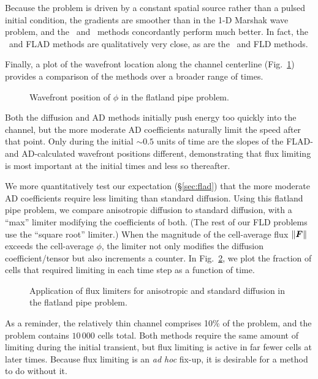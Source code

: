 Because the problem is driven by a constant spatial source rather than a pulsed
initial condition, the gradients are smoother than in the 1-D Marshak wave
problem, and the \Pone\ and \APone\ methods concordantly perform much better.
In fact, the
\APone\ and FLAD methods are qualitatively very close, as are the \Pone\ and FLD
methods.

Finally, a plot of the wavefront location along the channel centerline
(Fig.~\ref{fig:crashaltWavefront}) provides a comparison of the methods over a
broader range of times.
%
\begin{figure}[htb]
  \centering\small
  
  \caption{Wavefront position of $\phi$ in the flatland pipe problem.}
  \label{fig:crashaltWavefront}
\end{figure}
%
Both the diffusion and AD methods initially push energy too quickly into the
channel, but the more moderate AD coefficients naturally limit the speed after
that point. Only during the initial $\sim0.5$ units of time are the slopes of the
FLAD- and AD-calculated wavefront positions different, demonstrating that
flux limiting is most important at the initial times and less so thereafter.

We more quantitatively test our expectation (\S\ref{sec:flad}) that the more
moderate AD coefficients require less limiting than standard diffusion.
Using this flatland pipe problem, we compare anisotropic diffusion to
standard diffusion, with a ``max'' limiter modifying the coefficients of both.
(The rest of our FLD problems use the ``square root'' limiter.)
When the magnitude of the cell-average flux $\left\| \bm{F} \right\|$ exceeds the cell-average
$\phi$, the limiter not only modifies the diffusion coefficient/tensor but also
increments a counter. In Fig.~\ref{fig:crashaltFld}, we plot the fraction of
cells that required limiting in each time step as a function of time. 
%
\begin{figure}[htb]
  \centering\small
  
  \caption{Application of flux limiters for anisotropic and standard diffusion
  in the flatland pipe problem.}
  \label{fig:crashaltFld}
\end{figure}
%
As a reminder, the relatively thin channel comprises 10\% of the problem, and
the problem contains $10\,000$ cells total. Both methods require the same
amount of limiting during the initial transient, but flux limiting is active in
far fewer cells at later times. Because flux limiting is an \emph{ad hoc}
fix-up, it is desirable for a method to do without it.

